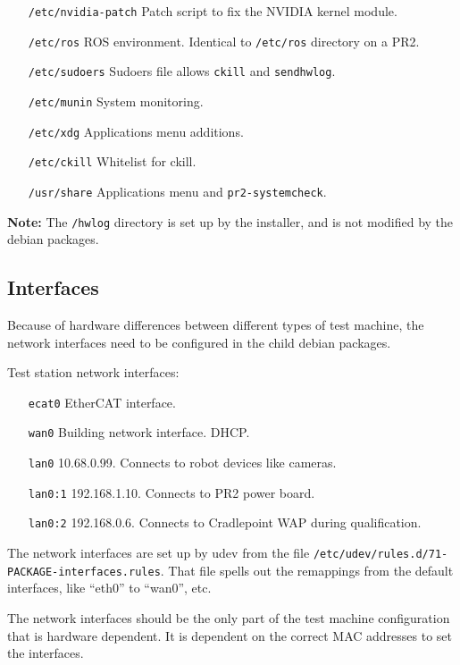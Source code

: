 \documentclass[11pt]{report}
\begin{document}
\begin{itemize}
\item [\texttt{/etc/nvidia-patch}] Patch script to fix the NVIDIA kernel module.
\item [\texttt{/etc/ros}] ROS environment. Identical to \texttt{/etc/ros} directory on a PR2.
\item [\texttt{/etc/sudoers}] Sudoers file allows \texttt{ckill} and \texttt{sendhwlog}.
\item [\texttt{/etc/munin}] System monitoring.
\item [\texttt{/etc/xdg}] Applications menu additions.
\item [\texttt{/etc/ckill}] Whitelist for ckill.
\item [\texttt{/usr/share}] Applications menu and \texttt{pr2-systemcheck}.
\end{itemize}

{\bf Note:} The \texttt{/hwlog} directory is set up by the installer, and is not modified by the debian packages.

\subsection{Interfaces}

Because of hardware differences between different types of test machine, the network interfaces need to be configured in the child debian packages.

Test station network interfaces:
\begin{itemize}
\item [\texttt{ecat0}] EtherCAT interface.
\item [\texttt{wan0}] Building network interface. DHCP.
\item [\texttt{lan0}] 10.68.0.99. Connects to robot devices like cameras.
\item [\texttt{lan0:1}] 192.168.1.10. Connects to PR2 power board.
\item [\texttt{lan0:2}] 192.168.0.6. Connects to Cradlepoint WAP during qualification.
\end{itemize}

The network interfaces are set up by udev from the file \texttt{/etc/udev/rules.d/71-PACKAGE-interfaces.rules}. That file spells out the remappings from the default interfaces, like ``eth0'' to ``wan0'', etc.

The network interfaces should be the only part of the test machine configuration that is hardware dependent. It is dependent on the correct MAC addresses to set the interfaces.
\end{document}

